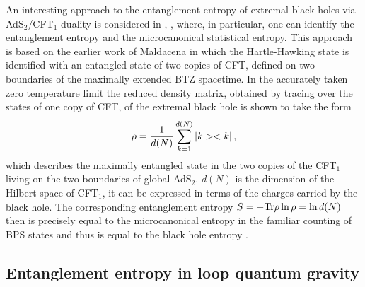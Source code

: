 \documentclass[12pt]{article}
\def\Tr{\hbox{Tr}}
\def\be{\begin{eqnarray}}
\def\ee{\end{eqnarray}}
\def\lb{\label}
\def\o{\over}
\begin{document}
An interesting approach to the entanglement entropy of extremal black holes via AdS$_2$/CFT$_1$ duality is considered in \cite{Azeyanagi:2007bj}, \cite{Sen:2011cn}, where, in particular, one can identify the entanglement entropy and the microcanonical statistical entropy. This approach is based on the earlier work of Maldacena  \cite{Maldacena:2001kr} in which the Hartle-Hawking state is identified with an entangled state of two copies of CFT, defined on two boundaries of the maximally extended BTZ spacetime. In the accurately taken zero temperature limit the reduced density matrix, obtained by tracing over the states of one copy of CFT,  of the extremal black hole is shown to take the form 
\be
\rho={1\o d(N)}\sum_{k=1}^{d(N)}|k><k|\, ,
\lb{maximally entangled}
\ee
which describes the maximally entangled  state in the two copies of the CFT$_1$ living on the two boundaries of global AdS$_2$. 
$d(N)$ is the dimension of the Hilbert space of CFT$_1$, it can be expressed in terms of the charges carried by the black hole.
The corresponding entanglement entropy
$S=-\Tr\rho\ln\rho=\ln d(N)$ then is precisely equal to the microcanonical entropy in the familiar counting of BPS states  and thus is equal to the black hole entropy \cite{Callan:1996dv}.


\subsection{Entanglement entropy in loop quantum gravity}
\end{document}

